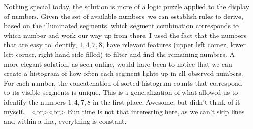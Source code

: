 Nothing special today, the solution is more of a logic puzzle applied to the display of numbers. Given the set of available numbers, we can establish rules to derive, based on the illuminated segments, which segment combination corresponds to which number and work our way up from there. I used the fact that the numbers that are easy to identify, $1,4,7,8$, have relevant features (upper left corner, lower left corner, right-hand side filled) to filter and find the remaining numbers. A more elegant solution, as seen online, would have been to notice that we can create a histogram of how often each segment lights up in all observed numbers. For each number, the concatenation of sorted histogram counts that correspond to its visible segments is unique. This is a generalization of what allowed us to identify the numbers $1,4,7,8$ in the first place. Awesome, but didn't think of it myself. 🎅
<br><br>
Run time is not that interesting here, as we can't skip lines and within a line, everything is constant.
